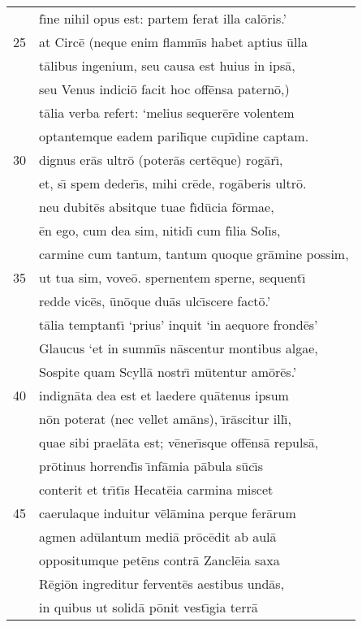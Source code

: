 \documentclass[paper=6in:9in,pagesize=pdftex,
               headinclude=on,footinclude=on,12pt]{scrbook}
\begin{document}
\begin{longtable}[p]{ r l }
 & f\={\i}ne nihil opus est: partem ferat illa cal\=oris.'\\ 
25 & at Circ\=e (neque enim flamm\={\i}s habet aptius \=ulla\\ 
 & t\=alibus ingenium, seu causa est huius in ips\=a,\\ 
 & seu Venus indici\=o facit hoc off\=ensa patern\=o,)\\ 
 & t\=alia verba refert: `melius sequer\=ere volentem\\ 
 & optantemque eadem paril\={\i}que cup\={\i}dine captam.\\ 
30 & dignus er\=as ultr\=o (poter\=as cert\=eque) rog\=ar\={\i},\\ 
 & et, s\={\i} spem deder\={\i}s, mihi cr\=ede, rog\=aberis ultr\=o.\\ 
 & neu dubit\=es absitque tuae f\={\i}d\=ucia f\=ormae,\\ 
 & \=en ego, cum dea sim, nitid\={\i} cum f\={\i}lia Sol\={\i}s,\\ 
 & carmine cum tantum, tantum quoque gr\=amine possim,\\ 
35 & ut tua sim, vove\=o. spernentem sperne, sequent\={\i}\\ 
 & redde vic\=es, \=un\=oque du\=as ulc\={\i}scere fact\=o.'\\ 
 & t\=alia temptant\={\i} `prius' inquit `in aequore frond\=es'\\ 
 & Glaucus `et in summ\={\i}s n\=ascentur montibus algae,\\ 
 & Sospite quam Scyll\=a nostr\={\i} m\=utentur am\=or\=es.'\\ 
40 & indign\=ata dea est et laedere qu\=atenus ipsum\\ 
 & n\=on poterat (nec vellet am\=ans), \={\i}r\=ascitur ill\={\i},\\ 
 & quae sibi prael\=ata est; v\=ener\={\i}sque off\=ens\=a repuls\=a,\\ 
 & pr\=otinus horrend\={\i}s \={\i}nf\=amia p\=abula s\=uc\={\i}s\\ 
 & conterit et tr\={\i}t\={\i}s Hecat\=eia carmina miscet\\ 
45 & caerulaque induitur v\=el\=amina perque fer\=arum\\ 
 & agmen ad\=ulantum medi\=a pr\=oc\=edit ab aul\=a\\ 
 & oppositumque pet\=ens contr\=a Zancl\=eia saxa\\ 
 & R\=egi\=on ingreditur fervent\=es aestibus und\=as,\\ 
 & in quibus ut solid\=a p\=onit vest\={\i}gia terr\=a\\ 

\end{longtable}
\end{document}
